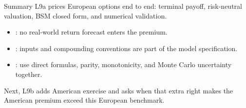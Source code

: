 \documentclass[aspectratio=169,11pt]{beamer}
\begin{document}
\begin{frame}{Summary}
  L9a prices European options end to end: terminal payoff, risk-neutral
  valuation, BSM closed form, and numerical validation.

  \vspace{0.4em}
  \begin{itemize}\setlength{\itemsep}{0.4em}
    \item {}: no real-world return
      forecast enters the premium.
    \item {}: inputs and compounding
      conventions are part of the model specification.
    \item {}: use direct formulas, parity,
      monotonicity, and Monte Carlo uncertainty together.
  \end{itemize}

  \vspace{0.5em}
  Next, L9b adds American exercise and asks when that extra right makes the
  American premium exceed this European benchmark.
\end{frame}
\end{document}
